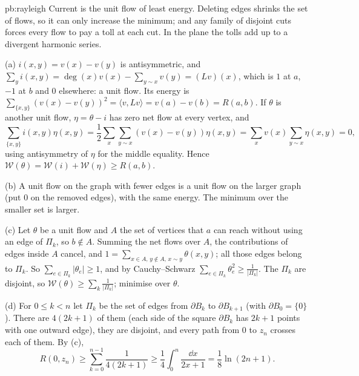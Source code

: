 \begin{solution}{pb:rayleigh}
\idea Current is the unit flow of least energy. Deleting edges shrinks the set of flows, so it can only increase the minimum; and any
family of disjoint cuts forces every flow to pay a toll at each cut. In the plane the tolls add up to a divergent harmonic series.

\writeup (a) $i(x,y)=v(x)-v(y)$ is antisymmetric, and $\sum_yi(x,y)=\deg(x)v(x)-\sum_{y\sim x}v(y)=(Lv)(x)$, which is $1$ at $a$, $-1$ at $b$ and $0$ elsewhere: a unit flow. Its
energy is $\sum_{\{x,y\}}(v(x)-v(y))^2=\langle v,Lv\rangle=v(a)-v(b)=R(a,b)$. If $\theta$ is another unit flow, $\eta=\theta-i$ has zero net flow at every vertex, and
\[
\sum_{\{x,y\}}i(x,y)\eta(x,y)=\frac12\sum_x\sum_{y\sim x}(v(x)-v(y))\eta(x,y)=\sum_xv(x)\sum_{y\sim x}\eta(x,y)=0,
\]
using antisymmetry of $\eta$ for the middle equality. Hence $\mathcal W(\theta)=\mathcal W(i)+\mathcal W(\eta)\ge R(a,b)$.

(b) A unit flow on the graph with fewer edges is a unit flow on the larger graph (put $0$ on the removed edges), with the same energy. The
minimum over the smaller set is larger.

(c) Let $\theta$ be a unit flow and $A$ the set of vertices that $a$ can reach without using an edge of $\Pi_k$, so $b\notin A$. Summing the net flows over $A$,
the contributions of edges inside $A$ cancel, and $1=\sum_{x\in A,\,y\notin A,\,x\sim y}\theta(x,y)$; all those edges belong to $\Pi_k$. So $\sum_{e\in\Pi_k}|\theta_e|\ge1$, and by Cauchy--Schwarz
$\sum_{e\in\Pi_k}\theta_e^2\ge\frac1{|\Pi_k|}$. The $\Pi_k$ are disjoint, so $\mathcal W(\theta)\ge\sum_k\frac1{|\Pi_k|}$; minimise over $\theta$.

(d) For $0\le k<n$ let $\Pi_k$ be the set of edges from $\partial B_k$ to $\partial B_{k+1}$ (with $\partial B_0=\{0\}$). There are $4(2k+1)$ of them (each side of the square $\partial B_k$ has
$2k+1$ points with one outward edge), they are disjoint, and every path from $0$ to $z_n$ crosses each of them. By (c),
\[
R(0,z_n)\ge\sum_{k=0}^{n-1}\frac1{4(2k+1)}\ge\frac14\int_0^n\frac{\dd x}{2x+1}=\frac18\ln(2n+1).
\]


\end{solution}
